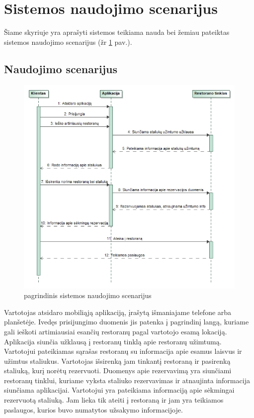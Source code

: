 \documentclass{VUMIFPSkursinis}
\begin{document}
\section{Sistemos naudojimo scenarijus}

Šiame skyriuje yra aprašyti sistemos teikiama nauda bei žemiau pateiktas sistemos naudojimo scenarijus (žr \ref{fig:maincase} pav.).

\subsection{Naudojimo scenarijus}
	\begin {figure}[H]
	\centering	
		
		\includegraphics[scale=0.7]{img/3lab/MainCase.jpg}
		\caption{pagrindinis sistemos naudojimo scenarijus}
		\label{fig:maincase}
	\end{figure}
Vartotojas atsidaro mobiliąją aplikaciją, įrašytą išmaniajame telefone arba planšetėje. Ivedęs prisijungimo duomenis jis patenka į pagrindinį langą, kuriame gali ieškoti artimiausiai esančių restoranų pagal vartotojo esamą lokaciją. Aplikacija siunčia užklausą į restoranų tinklą apie restoranų užimtumą. Vartotojui pateikiamas sąrašas restoranų su informacija apie esamus laisvus ir užimtus staliukus. Vartotojas išsirenką jam tinkantį restoraną ir pasirenką staliuką, kurį norėtų rezervuoti. Duomenys apie rezervavimą yra siunčiami restoranų tinklui, kuriame vyksta staliuko rezervavimas ir atnaujinta informacija siunčiama aplikacijai. Vartotojui yra pateikiama informaciją apie sėkmingai rezervuotą staliuką. Jam lieka tik ateiti į restoraną ir jam yra teikiamos paslaugos, kurios buvo numatytos užsakymo informacijoje.
\end{document}
